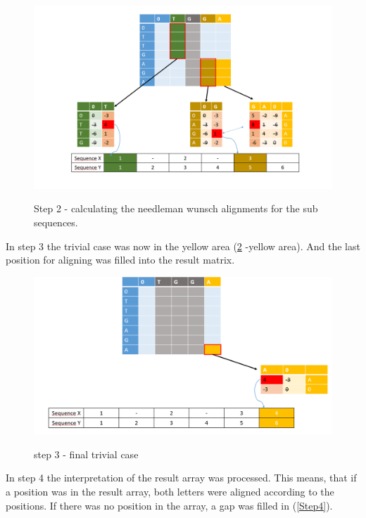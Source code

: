 \documentclass[%
   10pt,              %
   nenglish,           %
   a4paper,           %
   DIV11,             %
]{scrartcl}%
\begin{document}
  \begin{figure}[h]
   	\includegraphics[scale=0.25]{img/Hirschberg_Step2.png}
   	\label{Step2}
   	\caption{Step 2 - calculating the needleman wunsch alignments for the sub sequences.}
  \end{figure}
  
  In step 3 the trivial case was now in the yellow area (\ref{Step3} -yellow area). And the last position for aligning was filled into the result matrix. 
 
  \begin{figure}[h]
    \includegraphics[scale=0.25]{img/Hirschberg_Step3.png}
	\label{Step3}
	\caption{step 3 - final trivial case}
  \end{figure}
    
    In step 4 the interpretation of the result array was processed. This means, that if a position was in the result array, both letters were aligned according to the positions. If there was no position in the array, a gap was filled in (\ref{Step4}).
    
\end{document}
